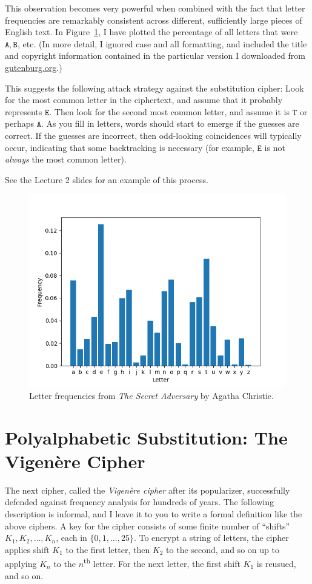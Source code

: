 \documentclass[11pt]{article}
\begin{document}
This observation becomes very powerful when combined with the fact that letter
frequencies are remarkably consistent across different, sufficiently large
pieces of English text. In Figure~\ref{fig:freq}, I have plotted the percentage
of all letters that were $\mathtt{A},\mathtt{B}$, etc. (In more detail, I
ignored case and all formatting, and included the title and copyright
information contained in the particular version I downloaded from
\url{gutenburg.org}.)

This suggests the following attack strategy against the substitution cipher:
Look for the most common letter in the ciphertext, and assume that it probably
represents $\mathtt{E}$. Then look for the second most common letter, and
assume it is $\mathtt{T}$ or perhaps $\mathtt{A}$. As you fill in letters,
words should start to emerge if the guesses are correct.  If the guesses are
incorrect, then odd-looking coincidences will typically occur, indicating that
some backtracking is necessary (for example, $\mathtt{E}$ is not \emph{always}
the most common letter). 

See the Lecture 2 slides for an example of this process.



\begin{figure}[t]
    \centering
\includegraphics[width=0.5\columnwidth]{freq.png}
    \caption{Letter frequencies from \emph{The Secret Adversary} by Agatha
    Christie.}
    \label{fig:freq}
\end{figure}

\section{Polyalphabetic Substitution: The Vigen\`{e}re Cipher}

The next cipher, called the \emph{Vigen\`{e}re cipher} after its popularizer,
successfully defended against frequency analysis for hundreds of years. The
following description is informal, and I leave it to you to write a formal
definition like the above ciphers. A key for the cipher consists of some
finite number of ``shifts'' $K_1,K_2,\ldots,K_n$, each in $\{0,1,\ldots,25\}$.
To encrypt a string of letters, the cipher applies shift $K_1$ to the first
letter, then $K_2$ to the second, and so on up to applying $K_n$ to the
$n$\textsuperscript{th} letter. For the next letter, the first shift $K_1$
is reusued, and so on.
\end{document}
